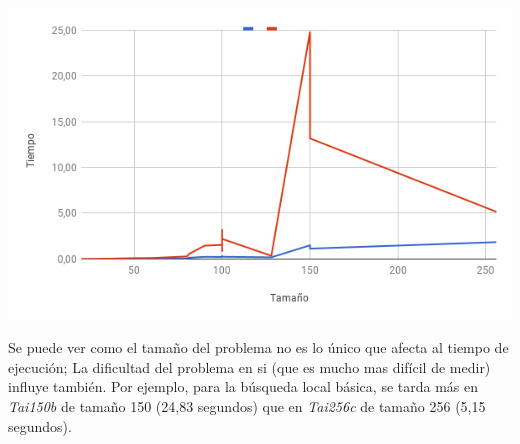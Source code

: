 \documentclass[a4paper, 12pt]{article}
\begin{document}
      \begin{center}
         \includegraphics[scale=0.6]{bl-vs-dlb}
      \end{center}
      
      Se puede ver como el tamaño del problema no es lo único que afecta al tiempo de ejecución; La dificultad del problema en si (que es mucho mas difícil de medir) influye también. Por ejemplo, para la búsqueda local básica, se tarda más en \textit{Tai150b} de tamaño 150 (24,83 segundos) que en \textit{Tai256c} de tamaño 256 (5,15 segundos).
      
      \newpage
\end{document}
